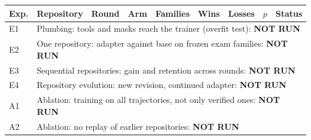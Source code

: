 \begin{tabular}{llllrrrrl}
\toprule
Exp. & Repository & Round & Arm & Families & Wins & Losses & $p$ & Status \\
\midrule
E1 & \multicolumn{8}{l}{Plumbing: tools and masks reach the trainer (overfit test): \textbf{NOT RUN}} \\
E2 & \multicolumn{8}{l}{One repository: adapter against base on frozen exam families: \textbf{NOT RUN}} \\
E3 & \multicolumn{8}{l}{Sequential repositories: gain and retention across rounds: \textbf{NOT RUN}} \\
E4 & \multicolumn{8}{l}{Repository evolution: new revision, continued adapter: \textbf{NOT RUN}} \\
A1 & \multicolumn{8}{l}{Ablation: training on all trajectories, not only verified ones: \textbf{NOT RUN}} \\
A2 & \multicolumn{8}{l}{Ablation: no replay of earlier repositories: \textbf{NOT RUN}} \\
\bottomrule
\end{tabular}
